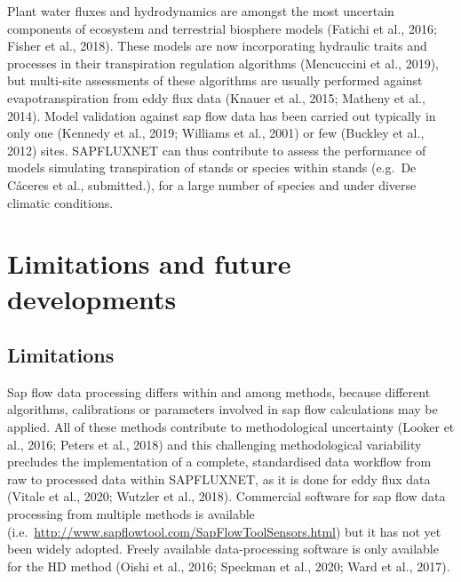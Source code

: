 \documentclass[11pt,twoside]{reedthesis}
\begin{document}
Plant water fluxes and hydrodynamics are amongst the most uncertain
components of ecosystem and terrestrial biosphere models (Fatichi et
al., 2016; Fisher et al., 2018). These models are now incorporating
hydraulic traits and processes in their transpiration regulation
algorithms (Mencuccini et al., 2019), but multi-site assessments of
these algorithms are usually performed against evapotranspiration from
eddy flux data (Knauer et al., 2015; Matheny et al., 2014). Model
validation against sap flow data has been carried out typically in only
one (Kennedy et al., 2019; Williams et al., 2001) or few (Buckley et
al., 2012) sites. SAPFLUXNET can thus contribute to assess the
performance of models simulating transpiration of stands or species
within stands (e.g.~De Cáceres et al., submitted.), for a large number
of species and under diverse climatic conditions.\par

\section{Limitations and future
developments}\label{limitations-and-future-developments}

\subsection{Limitations}\label{limitations}

Sap flow data processing differs within and among methods, because
different algorithms, calibrations or parameters involved in sap flow
calculations may be applied. All of these methods contribute to
methodological uncertainty (Looker et al., 2016; Peters et al., 2018)
and this challenging methodological variability precludes the
implementation of a complete, standardised data workflow from raw to
processed data within SAPFLUXNET, as it is done for eddy flux data
(Vitale et al., 2020; Wutzler et al., 2018). Commercial software for sap
flow data processing from multiple methods is available
(i.e.~\url{http://www.sapflowtool.com/SapFlowToolSensors.html}) but it
has not yet been widely adopted. Freely available data-processing
software is only available for the HD method (Oishi et al., 2016;
Speckman et al., 2020; Ward et al., 2017).\par
\end{document}
